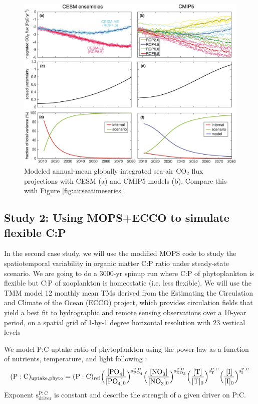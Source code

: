 \documentclass[a4paper]{article}
\begin{document}
\begin{enumerate}
\begin{figure}[h!]   %
   \centering
   \includegraphics[trim=0 760 0 0,clip,scale=0.3]{Lovenduski16_GBC_Fig2.jpg}
   \caption[]{Modeled annual-mean globally integrated sea-air $\mathrm{CO_2}$ flux projections \citep[from][]{Lovenduski16} with CESM (a) and CMIP5 models (b). Compare this with Figure \ref{fig:airseatimeseries}.}
   \label{fig:airseatimeseries_cmip5}
\end{figure}

\end{enumerate}

\subsection{Study 2: Using MOPS+ECCO to simulate flexible C:P}

In the second case study, we will use the modified MOPS code to study the spatiotemporal variability in organic matter C:P ratio under steady-state scenario. We are going to do a  3000-yr spinup run where C:P of phytoplankton is flexible but C:P of zooplankton is homeostatic (i.e. less flexible). We will use the TMM model 12 monthly mean TMs derived from the Estimating the Circulation and Climate of the Ocean (ECCO) project, which provides circulation fields that yield a best fit to hydrographic and remote sensing observations over a 10-year period, on a spatial grid of 1-by-1 degree horizontal resolution with 23 vertical levels

We model P:C uptake ratio of phytoplankton using the power-law as a function of nutrients, temperature, and light following \cite{Tanioka20}:
\begin{equation}
   \mathrm{(P:C)_{uptake,phyto}} = \mathrm{(P:C)_{ref} \Bigl (\frac{[\ce{PO4}]}{[\ce{PO4}]_0} \Bigr )^{s^{P:C}_{PO_4}} \Bigl (\frac{[\ce{NO3}]}{[\ce{NO3}]_0} \Bigr )^{s^{P:C}_{NO_3}} \Bigl (\frac{[\ce{T}]}{[\ce{T}]_0} \Bigr )^{s^{P:C}_{T}} \Bigl (\frac{[\ce{I}]}{[\ce{I}]_0} \Bigr )^{s^{P:C}_{I}}} \label{eq:eq_pcphy}
\end{equation}
Exponent $\mathrm{{s^{P:C}_{driver}}}$ is constant and describe the strength of a given driver on P:C. 
\end{document}
